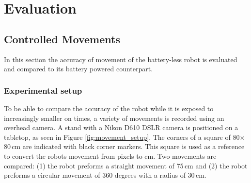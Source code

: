 \chapter{Evaluation}
\label{chp:evaluation}

\section{Controlled Movements}
\label{sec:controlled_movements}




In this section the accuracy of movement of the battery-less robot is evaluated and compared to its battery powered counterpart.

\subsection{Experimental setup}

To be able to compare the accuracy of the robot while it is exposed to increasingly smaller on times, a variety of movements is recorded using an overhead camera.
A stand with a Nikon D610 DSLR camera is positioned on a tabletop, as seen in Figure \ref{fig:movement_setup}.
The corners of a square of 80$\times$80\,cm are indicated with black corner markers.
This square is used as a reference to convert the robots movement from pixels to cm.
Two movements are compared: (1) the robot preforms a straight movement of 75\,cm and (2) the robot preforms a circular movement of 360 degrees with a radius of 30\,cm.

